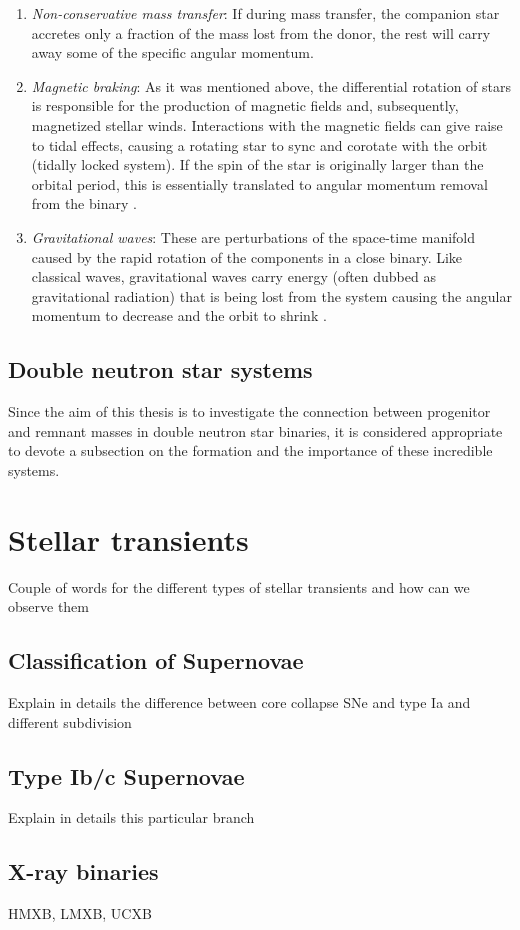 \documentclass[../../main/thesis_msc.tex]{subfiles}
\begin{document}
				\begin{enumerate}[label=(\roman*)]
				
					\item \emph{Non-conservative mass transfer}: If during mass transfer, the companion star accretes only a fraction of the mass lost from the donor, the rest will carry away some of the specific angular momentum.
					\item \emph{Magnetic braking}: As it was mentioned above, the differential rotation of stars is responsible for the production of magnetic fields and, subsequently, magnetized stellar winds. Interactions with the magnetic fields can give raise to tidal effects, causing a rotating star to sync and corotate with the orbit (tidally locked system). If the spin of the star is originally larger than the orbital period, this is essentially translated to angular momentum removal from the binary \citep[see also][]{Rappaport1983}.
					\item \emph{Gravitational waves}:  These are perturbations of the space-time manifold caused by the rapid rotation of the components in a close binary. Like classical waves, gravitational waves carry energy (often dubbed as gravitational radiation) that is being lost from the system causing the angular momentum to decrease and the orbit to shrink \citep[see also][]{Peters1964}.
				
				\end{enumerate}
				
				
			\subsection{Double neutron star systems}
			
				Since the aim of this thesis is to investigate the connection between progenitor and remnant masses in double neutron star binaries, it is considered appropriate to devote a subsection on the formation and the importance of these incredible systems.
				
	\section{Stellar transients}
	
		Couple of words for the different types of stellar transients and how can we observe them
		
			\subsection{Classification of Supernovae}
			
				Explain in details the difference between core collapse SNe and type Ia and different subdivision
				
			\subsection{Type Ib/c Supernovae}
			
				Explain in details this particular branch
				
			\subsection{X-ray binaries}
			
				HMXB, LMXB, UCXB
    
    
    
\end{document}

